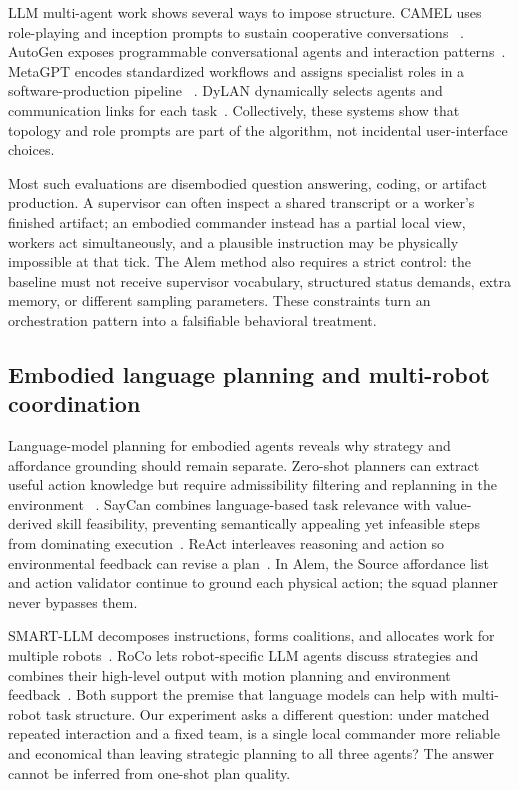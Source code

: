 \documentclass[11pt]{article}
\begin{document}
LLM multi-agent work shows several ways to impose structure.  CAMEL uses
role-playing and inception prompts to sustain cooperative conversations
~\citep{li2023camel}.  AutoGen exposes programmable conversational agents and
interaction patterns~\citep{wu2023autogen}.  MetaGPT encodes standardized workflows
and assigns specialist roles in a software-production pipeline
~\citep{hong2024metagpt}.  DyLAN dynamically selects agents and communication links
for each task~\citep{liu2023dylan}.  Collectively, these systems show that topology
and role prompts are part of the algorithm, not incidental user-interface choices.

Most such evaluations are disembodied question answering, coding, or artifact
production.  A supervisor can often inspect a shared transcript or a worker's
finished artifact; an embodied commander instead has a partial local view, workers
act simultaneously, and a plausible instruction may be physically impossible at
that tick.  The Alem method also requires a strict control: the baseline must not
receive supervisor vocabulary, structured status demands, extra memory, or
different sampling parameters.  These constraints turn an orchestration pattern
into a falsifiable behavioral treatment.

\subsection{Embodied language planning and multi-robot coordination}

Language-model planning for embodied agents reveals why strategy and affordance
grounding should remain separate.  Zero-shot planners can extract useful action
knowledge but require admissibility filtering and replanning in the environment
~\citep{huang2022zeroshot}.  SayCan combines language-based task relevance with
value-derived skill feasibility, preventing semantically appealing yet infeasible
steps from dominating execution~\citep{ahn2023saycan}.  ReAct interleaves reasoning
and action so environmental feedback can revise a plan~\citep{yao2023react}.  In
Alem, the Source affordance list and action validator continue to ground each
physical action; the squad planner never bypasses them.

SMART-LLM decomposes instructions, forms coalitions, and allocates work for
multiple robots~\citep{kannan2023smartllm}.  RoCo lets robot-specific LLM agents
discuss strategies and combines their high-level output with motion planning and
environment feedback~\citep{mandi2023roco}.  Both support the premise that language
models can help with multi-robot task structure.  Our experiment asks a different
question: under matched repeated interaction and a fixed team, is a single local
commander more reliable and economical than leaving strategic planning to all
three agents?  The answer cannot be inferred from one-shot plan quality.
\end{document}
